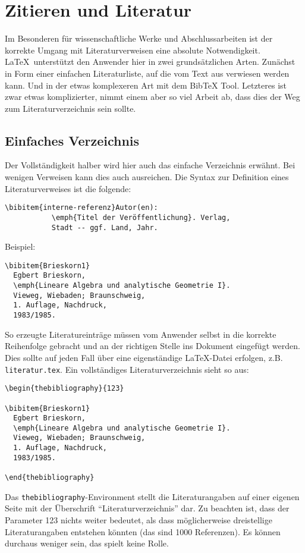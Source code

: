 
\chapter{Zitieren und Literatur}

Im Besonderen für wissenschaftliche Werke und Abschlussarbeiten ist der korrekte Umgang mit Literaturverweisen eine absolute Notwendigkeit. \LaTeX\ unterstützt den Anwender hier in zwei grundsätzlichen Arten. Zunächst in Form einer einfachen Literaturliste, auf die vom Text aus verwiesen werden kann. Und in der etwas komplexeren Art mit dem BibTeX Tool. Letzteres ist zwar etwas komplizierter, nimmt einem aber so viel Arbeit ab, dass dies der Weg zum Literaturverzeichnis sein sollte. 

\section{Einfaches Verzeichnis}

Der Vollständigkeit halber wird hier auch das einfache Verzeichnis erwähnt. Bei wenigen Verweisen kann dies auch ausreichen. Die Syntax zur Definition eines Literaturverweises ist die folgende:
\begin{verbatim}
\bibitem{interne-referenz}Autor(en):
           \emph{Titel der Veröffentlichung}. Verlag,
           Stadt -- ggf. Land, Jahr.
\end{verbatim}
Beispiel:
\begin{verbatim}
\bibitem{Brieskorn1}
  Egbert Brieskorn,
  \emph{Lineare Algebra und analytische Geometrie I}.
  Vieweg, Wiebaden; Braunschweig,
  1. Auflage, Nachdruck,
  1983/1985.
\end{verbatim}

So erzeugte Literatureinträge müssen vom Anwender selbst in die korrekte Reihenfolge gebracht und an der richtigen Stelle ins Dokument eingefügt werden. Dies sollte auf jeden Fall über eine eigenständige \LaTeX-Datei erfolgen, z.B. \texttt{literatur.tex}. Ein vollständiges Literaturverzeichnis sieht so aus:
\begin{verbatim}
\begin{thebibliography}{123}

\bibitem{Brieskorn1}
  Egbert Brieskorn,
  \emph{Lineare Algebra und analytische Geometrie I}.
  Vieweg, Wiebaden; Braunschweig,
  1. Auflage, Nachdruck,
  1983/1985.

\end{thebibliography}
\end{verbatim}
Das \texttt{thebibliography}-Environment stellt die Literaturangaben auf einer eigenen Seite mit der Überschrift "`Literaturverzeichnis"' dar. Zu beachten ist, dass der Parameter 123 nichts weiter bedeutet, als dass möglicherweise dreistellige Literaturangaben entstehen könnten (das sind 1000 Referenzen). Es können durchaus weniger sein, das spielt keine Rolle. 

